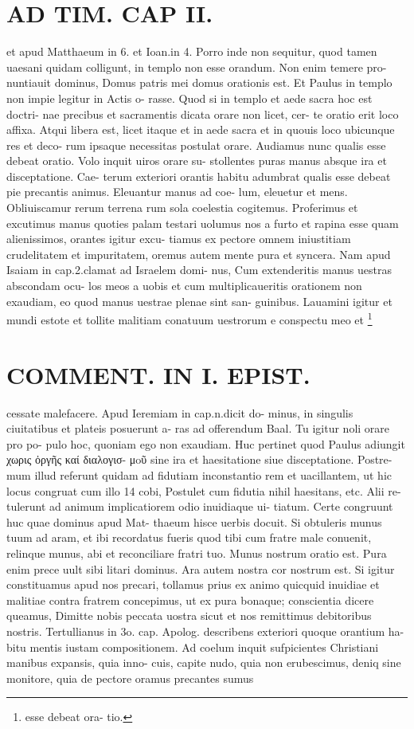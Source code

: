\documentclass{article}
\begin{document}
\begin{pages}
\section*{AD TIM. CAP II. }
\marginpar{[ p.118 ]}\pstart et apud Matthaeum in 6. et Ioan.in 4. Porro inde non sequitur, quod tamen uaesani quidam colligunt, in templo non esse orandum. Non enim temere pro- nuntiauit dominus, Domus patris mei domus orationis est. Et Paulus in templo non impie legitur in Actis o- rasse. Quod si in templo et aede sacra hoc est doctri- nae precibus et sacramentis dicata orare non licet, cer- te oratio erit loco affixa. Atqui libera est, licet itaque et in aede sacra et in quouis loco ubicunque res et deco- rum ipsaque necessitas postulat orare. Audiamus nunc qualis esse debeat oratio. Volo inquit uiros orare su- stollentes puras manus absque ira et disceptatione. Cae- terum exteriori orantis habitu adumbrat qualis esse debeat pie precantis animus. Eleuantur manus ad coe- lum, eleuetur et mens. Obliuiscamur rerum terrena rum sola coelestia cogitemus. Proferimus et excutimus manus quoties palam testari uolumus nos a furto et rapina esse quam alienissimos, orantes igitur excu- tiamus ex pectore omnem iniustitiam crudelitatem et impuritatem, oremus autem mente pura et syncera. Nam apud Isaiam in cap.2.clamat ad Israelem domi- nus, Cum extenderitis manus uestras abscondam ocu- los meos a uobis et cum multiplicaueritis orationem non exaudiam, eo quod manus uestrae plenae sint san- guinibus. Lauamini igitur et mundi estote et tollite malitiam conatuum uestrorum e conspectu meo et  \pend\footnote{\footnotesizeQualis esse debeat ora- tio. }
\section*{COMMENT. IN I. EPIST. }\pstart cessate malefacere. Apud Ieremiam in cap.n.dicit do- minus, in singulis ciuitatibus et plateis posuerunt a- ras ad offerendum Baal. Tu igitur noli orare pro po- pulo hoc, quoniam ego non exaudiam. Huc pertinet quod Paulus adiungit χωρις ὀργῆς καί διαλογισ- μoῦ sine ira et haesitatione siue disceptatione. Postre- mum illud referunt quidam ad fidutiam inconstantio rem et uacillantem, ut hic locus congruat cum illo 14 cobi, Postulet cum fidutia nihil haesitans, etc. Alii re- tulerunt ad animum implicatiorem odio inuidiaque ui- tiatum. Certe congruunt huc quae dominus apud Mat- thaeum hisce uerbis docuit. Si obtuleris munus tuum ad aram, et ibi recordatus fueris quod tibi cum fratre male conuenit, relinque munus, abi et reconciliare fratri tuo. Munus nostrum oratio est. Pura enim prece uult sibi litari dominus. Ara autem nostra cor nostrum est. Si igitur constituamus apud nos precari, tollamus prius ex animo quicquid inuidiae et malitiae contra fratrem concepimus, ut ex pura bonaque; conscientia dicere queamus, Dimitte nobis peccata uostra sicut et nos remittimus debitoribus nostris. Tertullianus in 3o. cap. Apolog. describens exteriori quoque orantium ha- bitu mentis iustam compositionem. Ad coelum inquit sufpicientes Christiani manibus expansis, quia inno- cuis, capite nudo, quia non erubescimus, deniq sine monitore, quia de pectore oramus precantes sumus  \pend

\end{pages}
\end{document}
